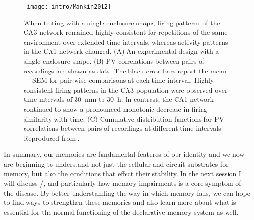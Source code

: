 \begin{figure}
	\centering
	\texttt{[image: intro/Mankin2012]}
	\caption[Place cell population stability over days]{
		When testing with a single enclosure shape, firing patterns of the CA3 network remained highly consistent for repetitions of the same environment over extended time intervals, whereas activity patterns in the CA1 network changed.
		(A) An experimental design with a single enclosure shape.
		(B) PV correlations between pairs of recordings are shown as dots. The black error bars report the mean~$\pm$~SEM for pair-wise comparisons at each time interval.
		Highly consistent firing patterns in the CA3 population were observed over time intervals of 30~min to 30~h. In contrast, the CA1 network continued to show a pronounced monotonic decrease in firing similarity with time.
		(C) Cumulative distribution functions for PV correlations between pairs of recordings at different time intervals
	Reproduced from \citet{Mankin2012}.}
	\label{fig:intro:memory:time_stability}
\end{figure}

In summary, our memories are fundamental features of our identity and we now are beginning to understand not just the cellular and circuit substrates for memory, but also the conditions that effect their stability.
In the next session I will discuss \scz/, and particularly how memory impairments is a core symptom of the disease.
By better understanding the way in which memory fails, we can hope to find ways to strengthen these memories and also learn more about what is essential for the normal functioning of the declarative memory system as well.